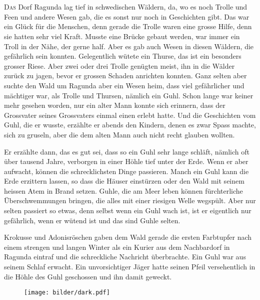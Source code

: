 \chapter*{}
\lettrine[lines=3]{\color{red}D}{as} Dorf Ragunda lag tief in schwedischen Wäldern, da, wo es noch Trolle und Feen und andere Wesen gab, die es sonst nur noch in Geschichten gibt. Das war ein Glück für die Menschen, denn gerade die Trolle waren eine grosse Hilfe, denn sie hatten sehr viel Kraft. Musste eine Brücke gebaut werden, war immer ein Troll in der Nähe, der gerne half. Aber es gab auch Wesen in diesen Wäldern, die gefährlich sein konnten. Gelegentlich wütete ein Thurse, das ist ein besonders grosser Riese. Aber zwei oder drei Trolle genügten meist, ihn in die Wälder zurück zu jagen, bevor er grossen Schaden anrichten konnten. Ganz selten aber suchte den Wald um Ragunda aber ein Wesen heim, dass viel gefährlicher und mächtiger war, als Trolle und Thursen, nämlich ein Guhl. Schon lange war keiner mehr gesehen worden, nur ein alter Mann konnte sich erinnern, dass der Grossvater seines Grossvaters einmal einen erlebt hatte. Und die Geschichten vom Guhl, die er wusste, erzählte er abends den Kindern, denen es zwar Spass machte, sich zu gruseln, aber die dem alten Mann auch nicht recht glauben wollten. 

Er erzählte dann, das es gut sei, dass so ein Guhl sehr lange schläft, nämlich oft über tausend Jahre, verborgen in einer Höhle tief unter der Erde. Wenn er aber aufwacht, können die schrecklichsten Dinge passieren. Manch ein Guhl kann die Erde erzittern lassen, so dass die Häuser einstürzen oder den Wald mit seinem heissen Atem in Brand setzen. Guhle, die am Meer leben können fürchterliche Überschwemmungen bringen, die alles mit einer riesigen Welle wegspült. Aber nur selten passiert so etwas, denn selbst wenn ein Guhl wach ist, ist er eigentlich nur gefährlich, wenn er wütend ist und das sind Guhle selten.

Krokusse und Adonisröschen gaben dem Wald gerade die ersten Farbtupfer nach einem strengen  und langen Winter als ein Kurier aus dem Nachbardorf in Ragunda eintraf und die schreckliche Nachricht überbrachte. Ein Guhl war aus seinem Schlaf erwacht. Ein unvorsichtiger Jäger hatte seinen Pfeil versehentlich in die Höhle des Guhl geschossen und ihn damit geweckt.

\begin{figure}[hb]
\centering
\texttt{[image: bilder/dark.pdf]}
\end{figure}


